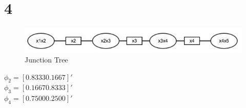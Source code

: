 \section*{4}
\begin{figure}[ht]
    \centering
    \includegraphics[width=1\textwidth]{figures/ml4.jpg}
    \caption{Junction Tree}
\end{figure}

$\phi_2 = [ 0.8333 0.1667 ]' $\\
$\phi_3 = [ 0.1667 0.8333 ]' $\\
$\phi_4 = [ 0.7500 0.2500 ]' $\\


